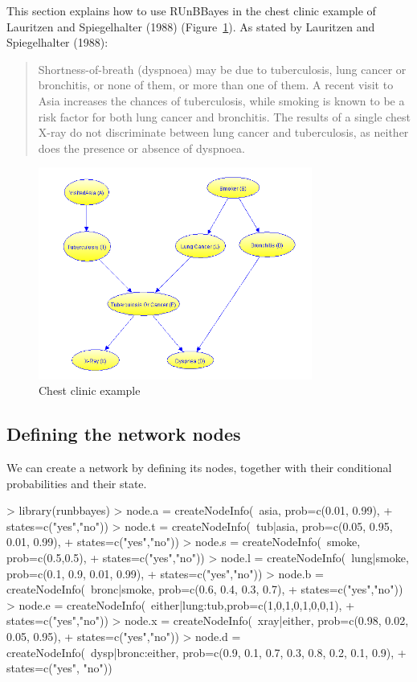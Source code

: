\documentclass[a4paper]{article}
\begin{document}
This section explains how to use RUnBBayes in the chest clinic example of Lauritzen and Spiegelhalter (1988) (Figure~\ref{fig:asia}). As stated by Lauritzen and Spiegelhalter (1988):

\begin{quotation}
Shortness-of-breath (dyspnoea) may be due to tuberculosis, lung cancer or bronchitis, or none of them, or more than one of them. A recent visit to Asia increases the chances of tuberculosis, while smoking is known to be a risk factor for both lung cancer and bronchitis. The results of a single chest X-ray do not discriminate between lung cancer and tuberculosis, as neither does the presence or absence of dyspnoea.
\end{quotation}

\begin{figure}[ht!]
\centering
\includegraphics[width=90mm]{chest-clinic.png}
\caption{Chest clinic example}
\label{fig:asia}
\end{figure}


\subsection{Defining the network nodes}

We can create a network by defining its nodes, together with their conditional probabilities and their state. 

\begin{Schunk}
\begin{Sinput}
> library(runbbayes)
> node.a = createNodeInfo(~asia, prob=c(0.01, 0.99), 
+                         states=c("yes","no"))
> node.t = createNodeInfo(~tub|asia, prob=c(0.05, 0.95, 0.01, 0.99),
+                         states=c("yes","no"))
> node.s = createNodeInfo(~smoke, prob=c(0.5,0.5), 
+                         states=c("yes","no"))
> node.l = createNodeInfo(~lung|smoke, prob=c(0.1, 0.9, 0.01, 0.99), 
+                         states=c("yes","no"))
> node.b = createNodeInfo(~bronc|smoke, prob=c(0.6, 0.4, 0.3, 0.7), 
+                         states=c("yes","no"))
> node.e = createNodeInfo(~either|lung:tub,prob=c(1,0,1,0,1,0,0,1),
+                         states=c("yes","no"))
> node.x = createNodeInfo(~xray|either, prob=c(0.98, 0.02, 0.05, 0.95), 
+                         states=c("yes","no"))
> node.d = createNodeInfo(~dysp|bronc:either, prob=c(0.9, 0.1, 0.7, 0.3, 0.8, 0.2, 0.1, 0.9), 
+                         states=c("yes", "no"))
\end{Sinput}
\end{Schunk}
\end{document}
